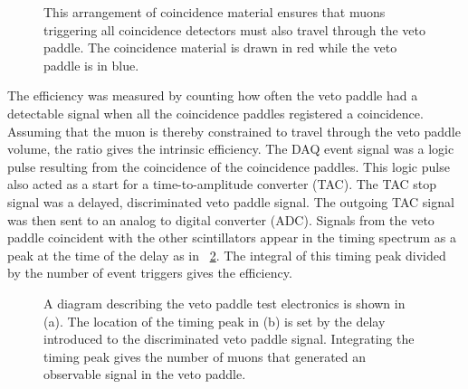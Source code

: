 \begin{figure}[!htbp]
\caption[Schematic of the testing arrangement for the veto paddles.]{This arrangement of coincidence material ensures that muons triggering all coincidence detectors must also travel through the veto paddle.  The coincidence material is drawn in red while the veto paddle is in blue.}
\label{fig:efficiencyTest}
\end{figure}

The efficiency was measured by counting how often the veto paddle had a detectable signal when all the coincidence paddles registered a coincidence.  Assuming that the muon is thereby constrained to travel through the veto paddle volume, the ratio gives the intrinsic efficiency.  The DAQ event signal was a logic pulse resulting from the coincidence of the coincidence paddles.  This logic pulse also acted as a start for a time-to-amplitude converter (TAC).  The TAC stop signal was a delayed, discriminated veto paddle signal.  The outgoing TAC signal was then sent to an analog to digital converter (ADC).  Signals from the veto paddle coincident with the other scintillators appear in the timing spectrum as a peak at the time of the delay as in {\fig}~\ref{fig:vetoTestElectronics}.  The integral of this timing peak divided by the number of event triggers gives the efficiency.
\begin{figure}[!htbp]
\centering
{}
\caption[Electronics used for testing of the veto paddles.]{A diagram describing the veto paddle test electronics is shown in (a).  The location of the timing peak in (b) is set by the delay introduced to the discriminated veto paddle signal.  Integrating the timing peak gives the number of muons that generated an observable signal in the veto paddle.}
\label{fig:vetoTestElectronics}
\end{figure}

